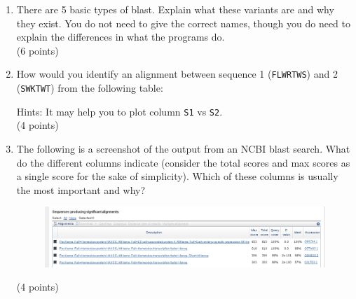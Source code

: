 \documentclass[11pt]{article}
\begin{document}
\begin{enumerate}
\item There are 5 basic types of blast. Explain what these variants are and
  why they exist. You do not need to give the correct names, though you do
  need to explain the differences in what the programs do.\\
  (6 points)

\item How would you identify an alignment between sequence 1 (\verb|FLWRTWS|) 
  and 2 (\verb|SWKTWT|) from the following table:
\begin{figure}[H]
  
\end{figure}
{\small Hints: It may help you to plot column \texttt{S1} vs
  \texttt{S2}.
}\\
(4 points)

\item The following is a screenshot of the output from an NCBI blast
  search. What do the different columns indicate (consider the total scores
  and max scores as a single score for the sake of simplicity). Which of these
  columns is usually the most important and why?
  \begin{figure}[H]
    \includegraphics[width=1.2\textwidth]{images/blast_result_list_top}
  \end{figure}
  (4 points)

\end{enumerate}
\end{document}
